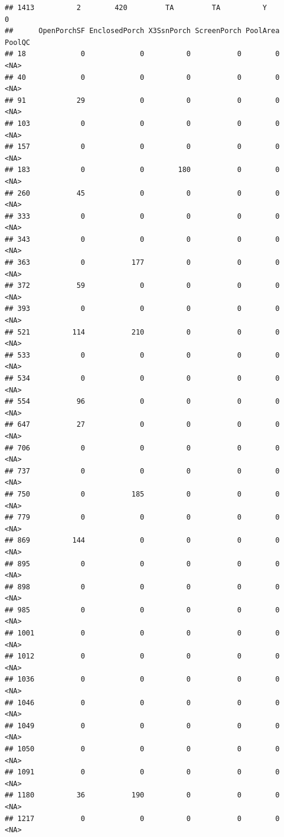 \documentclass[]{article}
\begin{document}
\begin{verbatim}
## 1413          2        420         TA         TA          Y          0
##      OpenPorchSF EnclosedPorch X3SsnPorch ScreenPorch PoolArea PoolQC
## 18             0             0          0           0        0   <NA>
## 40             0             0          0           0        0   <NA>
## 91            29             0          0           0        0   <NA>
## 103            0             0          0           0        0   <NA>
## 157            0             0          0           0        0   <NA>
## 183            0             0        180           0        0   <NA>
## 260           45             0          0           0        0   <NA>
## 333            0             0          0           0        0   <NA>
## 343            0             0          0           0        0   <NA>
## 363            0           177          0           0        0   <NA>
## 372           59             0          0           0        0   <NA>
## 393            0             0          0           0        0   <NA>
## 521          114           210          0           0        0   <NA>
## 533            0             0          0           0        0   <NA>
## 534            0             0          0           0        0   <NA>
## 554           96             0          0           0        0   <NA>
## 647           27             0          0           0        0   <NA>
## 706            0             0          0           0        0   <NA>
## 737            0             0          0           0        0   <NA>
## 750            0           185          0           0        0   <NA>
## 779            0             0          0           0        0   <NA>
## 869          144             0          0           0        0   <NA>
## 895            0             0          0           0        0   <NA>
## 898            0             0          0           0        0   <NA>
## 985            0             0          0           0        0   <NA>
## 1001           0             0          0           0        0   <NA>
## 1012           0             0          0           0        0   <NA>
## 1036           0             0          0           0        0   <NA>
## 1046           0             0          0           0        0   <NA>
## 1049           0             0          0           0        0   <NA>
## 1050           0             0          0           0        0   <NA>
## 1091           0             0          0           0        0   <NA>
## 1180          36           190          0           0        0   <NA>
## 1217           0             0          0           0        0   <NA>

\end{verbatim}
\end{document}
